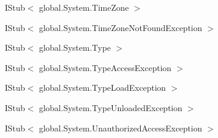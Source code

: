 \begin{DoxyCompactList}
\begin{DoxyCompactList}
\end{DoxyCompactList}
\item I\-Stub$<$ global.\-System.\-Time\-Zone $>$\begin{DoxyCompactList}
\item {}
\end{DoxyCompactList}
\item I\-Stub$<$ global.\-System.\-Time\-Zone\-Not\-Found\-Exception $>$\begin{DoxyCompactList}
\item {}
\end{DoxyCompactList}
\item I\-Stub$<$ global.\-System.\-Type $>$\begin{DoxyCompactList}
\item {}
\end{DoxyCompactList}
\item I\-Stub$<$ global.\-System.\-Type\-Access\-Exception $>$\begin{DoxyCompactList}
\item {}
\end{DoxyCompactList}
\item I\-Stub$<$ global.\-System.\-Type\-Load\-Exception $>$\begin{DoxyCompactList}
\item {}
\end{DoxyCompactList}
\item I\-Stub$<$ global.\-System.\-Type\-Unloaded\-Exception $>$\begin{DoxyCompactList}
\item {}
\end{DoxyCompactList}
\item I\-Stub$<$ global.\-System.\-Unauthorized\-Access\-Exception $>$\begin{DoxyCompactList}

\end{DoxyCompactList}
\end{DoxyCompactList}
